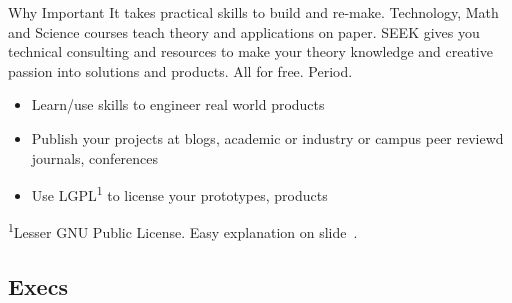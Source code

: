 \documentclass{beamer}
\begin{document}
\begin{frame}{Why Important}
It takes practical skills to build and re-make. Technology, Math and Science courses teach theory and applications on paper. SEEK gives you technical consulting and resources to make your theory knowledge and creative passion into solutions and products. All for free. Period.
\vskip 0.3cm
\begin{itemize}

\item Learn/use skills to engineer real world products
\item Publish your projects at blogs, academic or industry or campus peer reviewd journals, conferences
\item Use LGPL\textsuperscript{1} to license your prototypes, products
\end{itemize}
\vskip 0.3cm \textsuperscript{1}Lesser GNU Public License. Easy explanation on slide~\pageref{LGPL}. 
\end{frame}

\subsection{Execs}
\end{document}
